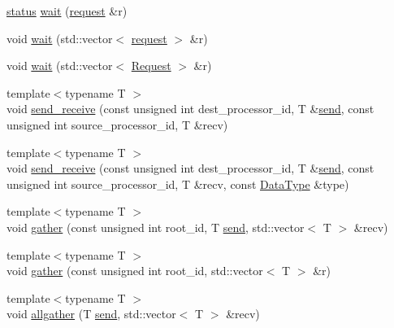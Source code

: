 \begin{DoxyCompactItemize}
\mbox{\hyperlink{structfemus_1_1_parallel_1_1status}{status}} \mbox{\hyperlink{namespacefemus_1_1_parallel_a893385de2800726af28b56b1c5630d2f}{wait}} (\mbox{\hyperlink{structfemus_1_1_parallel_1_1request}{request}} \&r)
\item 
void \mbox{\hyperlink{namespacefemus_1_1_parallel_a135cd955845e4e6ce003a4455ec54b17}{wait}} (std\+::vector$<$ \mbox{\hyperlink{structfemus_1_1_parallel_1_1request}{request}} $>$ \&r)
\item 
void \mbox{\hyperlink{namespacefemus_1_1_parallel_afa71a836a79155d206fc4900be688460}{wait}} (std\+::vector$<$ \mbox{\hyperlink{classfemus_1_1_parallel_1_1_request}{Request}} $>$ \&r)
\item 
{\footnotesize template$<$typename T $>$ }\\void \mbox{\hyperlink{namespacefemus_1_1_parallel_aa92d91cc52cf504bcd046ed47b6e390b}{send\+\_\+receive}} (const unsigned int dest\+\_\+processor\+\_\+id, T \&\mbox{\hyperlink{namespacefemus_1_1_parallel_a3126d0149eca349995ce4f5a314e3a89}{send}}, const unsigned int source\+\_\+processor\+\_\+id, T \&recv)
\item 
{\footnotesize template$<$typename T $>$ }\\void \mbox{\hyperlink{namespacefemus_1_1_parallel_a9a1e9e24951897be2b28dbc25e7e578c}{send\+\_\+receive}} (const unsigned int dest\+\_\+processor\+\_\+id, T \&\mbox{\hyperlink{namespacefemus_1_1_parallel_a3126d0149eca349995ce4f5a314e3a89}{send}}, const unsigned int source\+\_\+processor\+\_\+id, T \&recv, const \mbox{\hyperlink{classfemus_1_1_parallel_1_1_data_type}{Data\+Type}} \&type)
\item 
{\footnotesize template$<$typename T $>$ }\\void \mbox{\hyperlink{namespacefemus_1_1_parallel_a1b8489def6f9d403cde145eab7e56b3b}{gather}} (const unsigned int root\+\_\+id, T \mbox{\hyperlink{namespacefemus_1_1_parallel_a3126d0149eca349995ce4f5a314e3a89}{send}}, std\+::vector$<$ T $>$ \&recv)
\item 
{\footnotesize template$<$typename T $>$ }\\void \mbox{\hyperlink{namespacefemus_1_1_parallel_a8c6205b6971503ed97d8c013f226c1db}{gather}} (const unsigned int root\+\_\+id, std\+::vector$<$ T $>$ \&r)
\item 
{\footnotesize template$<$typename T $>$ }\\void \mbox{\hyperlink{namespacefemus_1_1_parallel_a5a47bc948850daf707b44045877a5de9}{allgather}} (T \mbox{\hyperlink{namespacefemus_1_1_parallel_a3126d0149eca349995ce4f5a314e3a89}{send}}, std\+::vector$<$ T $>$ \&recv)

\end{DoxyCompactItemize}
